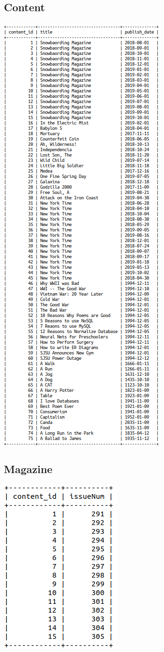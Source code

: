 \documentclass[letter, 12pt, titlepage]{article}
\begin{document}
		\subsection{Content}
			\includegraphics[scale=.7]{content.png}
		\subsection{Magazine}
			\includegraphics[scale=.5]{magazine.png}
\end{document}
